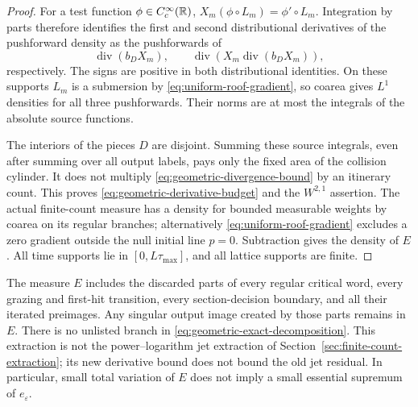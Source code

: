 \begin{proof}
For a test function $\phi\in C_c^\infty(\mathbb R)$,
$X_m(\phi\circ L_m)=\phi'\circ L_m$. Integration by parts therefore
identifies the first and second distributional derivatives of the
pushforward density as the pushforwards of
\begin{equation}\label{eq:geometric-density-derivatives}
 \operatorname{div}(b_DX_m),\qquad
 \operatorname{div}(X_m\operatorname{div}(b_DX_m)),
\end{equation}
respectively. The signs are positive in both distributional identities.
On these supports $L_m$ is a submersion by
\eqref{eq:uniform-roof-gradient}, so coarea gives $L^1$ densities for
all three pushforwards. Their norms are at most the integrals of the
absolute source functions.

The interiors of the pieces $D$ are disjoint. Summing these source
integrals, even after summing over all output labels, pays only the
fixed area of the collision cylinder. It does not multiply
\eqref{eq:geometric-divergence-bound} by an itinerary count. This proves
\eqref{eq:geometric-derivative-budget} and the $W^{2,1}$ assertion.
The actual finite-count measure has a density for bounded measurable
weights by coarea on its regular branches; alternatively
\eqref{eq:uniform-roof-gradient} excludes a zero gradient outside the
null initial line $p=0$. Subtraction gives the density of $E$.
All time supports lie in $[0,L\tau_{\max}]$, and all lattice supports
are finite.
\end{proof}

\begin{remark}\label{rem:geometric-extraction-scope}
The measure $E$ includes the discarded parts of every regular critical
word, every grazing and first-hit transition, every section-decision
boundary, and all their iterated preimages. Any singular output image
created by those parts remains in $E$. There is no unlisted branch in
\eqref{eq:geometric-exact-decomposition}. This extraction is not the
power--logarithm jet extraction of Section~\ref{sec:finite-count-extraction};
its new derivative bound does not bound the old jet residual. In
particular, small total variation of $E$ does not imply a small
essential supremum of $e_\varepsilon$.
\end{remark}
